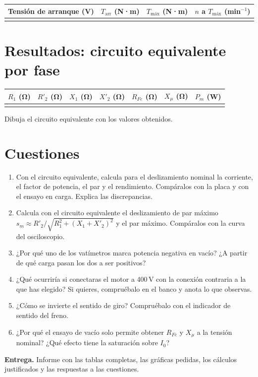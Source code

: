 \documentclass[11pt,a4paper]{article}
\begin{document}
\begin{tabularx}{\textwidth}{|X|X|X|X|}
  \hline
  Tensión de arranque (V) & $T_\text{arr}$ (N·m) & $T_\text{máx}$ (N·m) & $n$ a $T_\text{máx}$ (min$^{-1}$) \\ \hline
  & & & \\[6pt] \hline
\end{tabularx}

\section{Resultados: circuito equivalente por fase}
\begin{tabularx}{\textwidth}{|C|C|C|C|C|C|C|}
  \hline
  $R_1$ (Ω) & $R'_2$ (Ω) & $X_1$ (Ω) & $X'_2$ (Ω) & $R_{Fe}$ (Ω) & $X_\mu$ (Ω) & $P_m$ (W) \\ \hline
  & & & & & & \\[8pt] \hline
\end{tabularx}

Dibuja el circuito equivalente con los valores obtenidos.

\section{Cuestiones}
\begin{enumerate}
  \item Con el circuito equivalente, calcula para el deslizamiento nominal la corriente, el factor de potencia, el par y el rendimiento. Compáralos con la placa y con el ensayo en carga. Explica las discrepancias.
  \item Calcula con el circuito equivalente el deslizamiento de par máximo $s_m \approx R'_2/\sqrt{R_1^2 + (X_1+X'_2)^2}$ y el par máximo. Compáralos con la curva del osciloscopio.
  \item ¿Por qué uno de los vatímetros marca potencia negativa en vacío? ¿A partir de qué carga pasan los dos a ser positivos?
  \item ¿Qué ocurriría si conectaras el motor a 400\,V con la conexión contraria a la que has elegido? Si quieres, compruébalo en el banco y anota lo que observas.
  \item ¿Cómo se invierte el sentido de giro? Compruébalo con el indicador de sentido del freno.
  \item ¿Por qué el ensayo de vacío solo permite obtener $R_{Fe}$ y $X_\mu$ a la tensión nominal? ¿Qué efecto tiene la saturación sobre $I_0$?
\end{enumerate}

\vfill
\begin{nota}
  \textbf{Entrega.} Informe con las tablas completas, las gráficas pedidas, los cálculos justificados y las respuestas a las cuestiones.
\end{nota}
\end{document}
